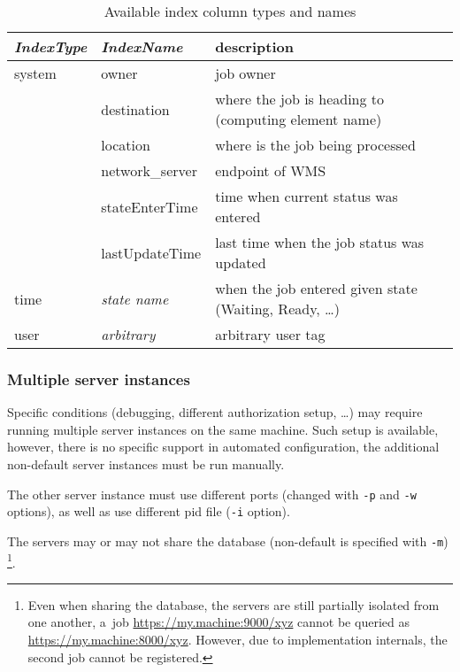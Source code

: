 \begin{table}
\begin{center}
\begin{tabularx}{.9\hsize}{|l|l|X|}
\hline
\emph{IndexType} & \emph{IndexName} & description \\
\hline
system & owner & job owner \\
 & destination & where the job is heading to (computing element name) \\
 & location & where is the job being processed \\
 & network\_server & endpoint of WMS \\
 & stateEnterTime & time when current status was entered \\
 & lastUpdateTime & last time when the job status was updated \\
\hline
time & \emph{state name} & when the job entered given state (Waiting, Ready, \dots) \\
\hline
user & \emph{arbitrary} & arbitrary user tag \\
\hline
\end{tabularx}
\end{center}
\caption{Available index column types and names}
\label{t:indexcols}
\end{table}


\subsubsection{Multiple server instances}


Specific conditions (\eg debugging, different authorization setup, \dots)
may require running multiple \LB server instances
on the same machine.
Such setup is available, however, there is no specific support in automated
configuration, the additional non-default server instances must be run manually.

The other server instance must use different ports (changed with \verb'-p'
and \verb'-w' options), as well as use different pid file (\verb'-i' option).

The servers may or may not share the database (non-default is specified
with  \verb'-m')%
\footnote{Even when sharing the database, the servers are still 
partially isolated from
one another, \eg a~job \url{https://my.machine:9000/xyz} cannot be queried 
as \url{https://my.machine:8000/xyz}.
However, due to implementation internals, the second job cannot be registered.}.

